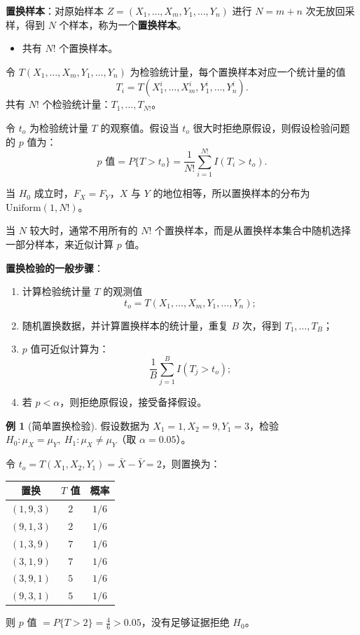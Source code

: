 \documentclass[11pt,a4paper]{report}
\theoremstyle{definition}
\newtheorem{example}{例}[chapter]
\begin{document}
\textbf{置换样本}：对原始样本 $Z=(X_{1},\ldots,X_{m},Y_{1},\ldots,Y_{n})$ 进行 $N=m+n$ 次无放回采样，得到 $N$ 个样本，称为一个\textbf{置换样本}。
\begin{itemize}[leftmargin=2em]
    \item 共有 $N!$ 个置换样本。
\end{itemize}

令 $T(X_{1},\ldots,X_{m},Y_{1},\ldots,Y_{n})$ 为检验统计量，每个置换样本对应一个统计量的值
\[
T_{i}=T(X_{1}^{i},\ldots,X_{m}^{i},Y_{1}^{i},\ldots,Y_{n}^{i}).
\]
共有 $N!$ 个检验统计量：$T_{1},\ldots,T_{N!}$。

令 $t_{o}$ 为检验统计量 $T$ 的观察值。假设当 $t_{o}$ 很大时拒绝原假设，则假设检验问题的 $p$ 值为：
\[
p\text{ 值}=P\{T>t_{o}\}=\frac{1}{N!}\sum_{i=1}^{N!}I(T_{i}>t_{o}).
\]

当 $H_{0}$ 成立时，$F_{X}=F_{Y}$，$X$ 与 $Y$ 的地位相等，所以置换样本的分布为 $\mathrm{Uniform}(1,N!)$。

当 $N$ 较大时，通常不用所有的 $N!$ 个置换样本，而是从置换样本集合中随机选择一部分样本，来近似计算 $p$ 值。

\textbf{置换检验的一般步骤}：
\begin{enumerate}[label=\arabic*.,leftmargin=2em]
    \item 计算检验统计量 $T$ 的观测值
    \[
    t_{o}=T(X_{1},\ldots,X_{m},Y_{1},\ldots,Y_{n});
    \]
    \item 随机置换数据，并计算置换样本的统计量，重复 $B$ 次，得到 $T_{1},\ldots,T_{B}$；
    \item $p$ 值可近似计算为：
    \[
    \frac{1}{B}\sum_{j=1}^{B}I(T_{j}>t_{o});
    \]
    \item 若 $p<\alpha$，则拒绝原假设，接受备择假设。
\end{enumerate}

\begin{example}[简单置换检验]
假设数据为 $X_{1}=1,X_{2}=9,Y_{1}=3$，检验 $H_{0}\colon\mu_{X}=\mu_{Y},\ H_{1}\colon\mu_{X}\neq\mu_{Y}$（取 $\alpha=0.05$）。

令 $t_{o}=T(X_{1},X_{2},Y_{1})=\bar{X}-\bar{Y}=2$，则置换为：

\begin{table}[htbp]
\centering
\begin{tabular}{@{}ccc@{}}
\toprule
置换 & $T$ 值 & 概率 \\
\midrule
$(1,9,3)$ & $2$ & $1/6$ \\
$(9,1,3)$ & $2$ & $1/6$ \\
$(1,3,9)$ & $7$ & $1/6$ \\
$(3,1,9)$ & $7$ & $1/6$ \\
$(3,9,1)$ & $5$ & $1/6$ \\
$(9,3,1)$ & $5$ & $1/6$ \\
\bottomrule
\end{tabular}
\end{table}

则 $p$ 值 $=P\{T>2\}=\frac{4}{6}>0.05$，没有足够证据拒绝 $H_{0}$。
\end{example}
\end{document}
